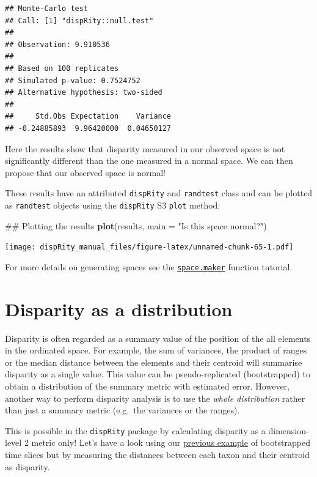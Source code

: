 \documentclass[]{book}
\newenvironment{Shaded}{\begin{snugshade}}{\end{snugshade}}
\newcommand{\KeywordTok}[1]{\textcolor[rgb]{0.13,0.29,0.53}{\textbf{#1}}}
\newcommand{\DataTypeTok}[1]{\textcolor[rgb]{0.13,0.29,0.53}{#1}}
\newcommand{\StringTok}[1]{\textcolor[rgb]{0.31,0.60,0.02}{#1}}
\newcommand{\NormalTok}[1]{#1}
\theoremstyle{definition}
\theoremstyle{definition}
\theoremstyle{remark}
\begin{document}
\begin{verbatim}
## Monte-Carlo test
## Call: [1] "dispRity::null.test"
## 
## Observation: 9.910536 
## 
## Based on 100 replicates
## Simulated p-value: 0.7524752 
## Alternative hypothesis: two-sided 
## 
##     Std.Obs Expectation    Variance 
## -0.24885893  9.96420000  0.04650127
\end{verbatim}

Here the results show that disparity measured in our observed space is
not significantly different than the one measured in a normal space. We
can then propose that our observed space is normal!

These results have an attributed \texttt{dispRity} and \texttt{randtest}
class and can be plotted as \texttt{randtest} objects using the
\texttt{dispRity} S3 \texttt{plot} method:

\begin{Shaded}
\begin{Highlighting}[]
\NormalTok{## Plotting the results}
\KeywordTok{plot}\NormalTok{(results, }\DataTypeTok{main =} \StringTok{"Is this space normal?"}\NormalTok{)}
\end{Highlighting}
\end{Shaded}

\texttt{[image: dispRity\_manual\_files/figure-latex/unnamed-chunk-65-1.pdf]}

For more details on generating spaces see the
\protect\hyperlink{Simulating-multidimensional-spaces}{\texttt{space.maker}}
function tutorial.

\hypertarget{disparity-as-a-distribution}{\section{Disparity as a
distribution}\label{disparity-as-a-distribution}}

Disparity is often regarded as a summary value of the position of the
all elements in the ordinated space. For example, the sum of variances,
the product of ranges or the median distance between the elements and
their centroid will summarise disparity as a single value. This value
can be pseudo-replicated (bootstrapped) to obtain a distribution of the
summary metric with estimated error. However, another way to perform
disparity analysis is to use the \emph{whole distribution} rather than
just a summary metric (e.g.~the variances or the ranges).

This is possible in the \texttt{dispRity} package by calculating
disparity as a dimension-level 2 metric only! Let's have a look using
our \protect\hyperlink{summarising-dispRity-data-plots}{previous
example} of bootstrapped time slices but by measuring the distances
between each taxon and their centroid as disparity.
\end{document}
